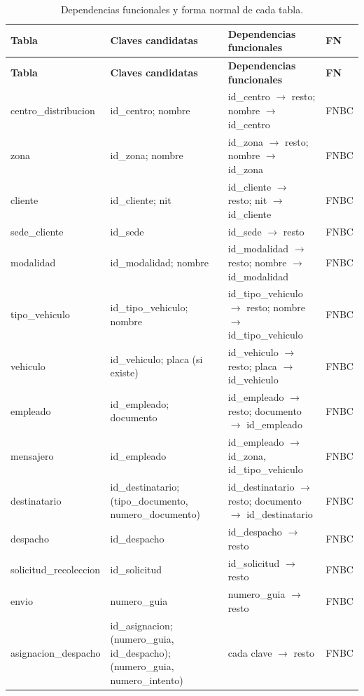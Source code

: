 {\singlespacing\small
\begin{longtable}{L{3.6cm} L{3.8cm} L{5.4cm} L{1.2cm}}
\caption{Dependencias funcionales y forma normal de cada tabla.}
\label{tab:formasnormales}\\
\toprule
\textbf{Tabla} & \textbf{Claves candidatas} & \textbf{Dependencias funcionales} & \textbf{FN} \\
\midrule
\endfirsthead
\toprule
\textbf{Tabla} & \textbf{Claves candidatas} & \textbf{Dependencias funcionales} & \textbf{FN} \\
\midrule
\endhead
\bottomrule
\endfoot
centro\_distribucion & id\_centro; nombre & id\_centro $\rightarrow$ resto; nombre $\rightarrow$ id\_centro & FNBC \\
zona & id\_zona; nombre & id\_zona $\rightarrow$ resto; nombre $\rightarrow$ id\_zona & FNBC \\
cliente & id\_cliente; nit & id\_cliente $\rightarrow$ resto; nit $\rightarrow$ id\_cliente & FNBC \\
sede\_cliente & id\_sede & id\_sede $\rightarrow$ resto & FNBC \\
modalidad & id\_modalidad; nombre & id\_modalidad $\rightarrow$ resto; nombre $\rightarrow$ id\_modalidad & FNBC \\
tipo\_vehiculo & id\_tipo\_vehiculo; nombre & id\_tipo\_vehiculo $\rightarrow$ resto; nombre $\rightarrow$ id\_tipo\_vehiculo & FNBC \\
vehiculo & id\_vehiculo; placa (si existe) & id\_vehiculo $\rightarrow$ resto; placa $\rightarrow$ id\_vehiculo & FNBC \\
empleado & id\_empleado; documento & id\_empleado $\rightarrow$ resto; documento $\rightarrow$ id\_empleado & FNBC \\
mensajero & id\_empleado & id\_empleado $\rightarrow$ id\_zona, id\_tipo\_vehiculo & FNBC \\
destinatario & id\_destinatario; (tipo\_documento, numero\_documento) & id\_destinatario $\rightarrow$ resto; documento $\rightarrow$ id\_destinatario & FNBC \\
despacho & id\_despacho & id\_despacho $\rightarrow$ resto & FNBC \\
solicitud\_recoleccion & id\_solicitud & id\_solicitud $\rightarrow$ resto & FNBC \\
envio & numero\_guia & numero\_guia $\rightarrow$ resto & FNBC \\
asignacion\_despacho & id\_asignacion; (numero\_guia, id\_despacho); (numero\_guia, numero\_intento) & cada clave $\rightarrow$ resto & FNBC \\

\end{longtable}}
